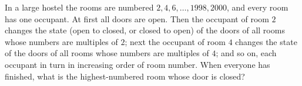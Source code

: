 In a large hostel the rooms are numbered $2,4,6,\dots,1998,2000$, and every room has one occupant. At first all doors are open. Then the occupant of room $2$ changes the state (open to closed, or closed to open) of the doors of all rooms whose numbers are multiples of $2$; next the occupant of room $4$ changes the state of the doors of all rooms whose numbers are multiples of $4$; and so on, each occupant in turn in increasing order of room number. When everyone has finished, what is the highest-numbered room whose door is closed?
